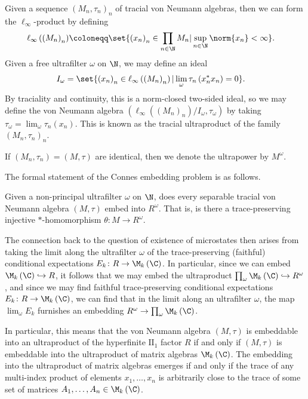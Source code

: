 \documentclass[10pt]{mypackage}
\renewcommand{\coloneq}{\coloneqq}
\begin{document}
Given a sequence $\left( M_n,\tau_n \right)_n$ of tracial von Neumann algebras, then we can form the $\ell_{\infty}$-product by defining
\begin{align*}
  \ell_{\infty}\left( \left( M_n \right)_n \right) &\coloneq \set{\left( x_n \right)_{n}\in \prod_{n\in \N}M_n | \sup_{n\in\N}\norm{x_n} < \infty}.
\end{align*}
Given a free ultrafilter $\omega$ on $\N$, we may define an ideal
\begin{align*}
  I_{\omega} &= \set{\left( x_n \right)_n\in \ell_{\infty}\left( \left( M_n \right)_n \right) | \lim_{\omega}\tau_n\left( x_n^{\ast}x_n \right) = 0}.
\end{align*}
By traciality and continuity, this is a norm-closed two-sided ideal, so we may define the von Neumann algebra $\left( \ell_{\infty}\left( \left( M_n \right)_n \right)/I_{\omega},\tau_{\omega} \right)$ by taking $\tau_{\omega} = \lim_{\omega}\tau_n\left( x_n \right)$. This is known as the tracial ultraproduct of the family $\left( M_n,\tau_n \right)_{n}$.

If $\left( M_n,\tau_n \right) = \left( M,\tau \right)$ are identical, then we denote the ultrapower by $M^{\omega}$.

The formal statement of the Connes embedding problem is as follows.
\begin{definition}
  Given a non-principal ultrafilter $\omega$ on $\N$, does every separable tracial von Neumann algebra $\left( M,\tau \right)$ embed into $R^{\omega}$. That is, is there a trace-preserving injective $\ast$-homomorphism $\theta\colon M\rightarrow R^{\omega}$.
\end{definition}
The connection back to the question of existence of microstates then arises from taking the limit along the ultrafilter $\omega$ of the trace-preserving (faithful) conditional expectations $E_k\colon R\rightarrow \M_k\left( \C \right)$. In particular, since we can embed $\M_k\left( \C \right)\hookrightarrow R$, it follows that we may embed the ultraproduct $\prod_{\omega}\M_k\left( \C \right)\hookrightarrow R^{\omega}$, and since we may find faithful trace-preserving conditional expectations $E_k\colon R\rightarrow \M_k\left( \C \right)$, we can find that in the limit along an ultrafilter $\omega$, the map $\lim_{\omega}E_k$ furnishes an embedding $R^{\omega}\rightarrow \prod_{\omega}\M_k\left( \C \right)$.

In particular, this means that the von Neumann algebra $\left( M,\tau \right)$ is embeddable into an ultraproduct of the hyperfinite $\text{II}_1$ factor $R$ if and only if $\left( M,\tau \right)$ is embeddable into the ultraproduct of matrix algebras $\M_k\left( \C \right)$. The embedding into the ultraproduct of matrix algebras emerges if and only if the trace of any multi-index product of elements $x_1,\dots,x_n$ is arbitrarily close to the trace of some set of matrices $A_1,\dots,A_n\in \M_k\left( \C \right)$.
\end{document}
